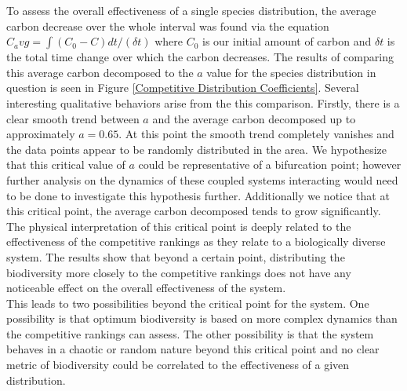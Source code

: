 \documentclass[12pt]{article}
\begin{document}
\begin{multicols}{2}
To assess the overall effectiveness of a single species distribution, the average carbon decrease over the whole interval was found via the equation $C_avg = \int (C_{0}-C)dt/(\delta t)$ where $C_{0}$ is our initial amount of carbon and $\delta t$ is the total time change over which the carbon decreases. The results of comparing this average carbon decomposed to the $a$ value for the species distribution in question is seen in Figure \ref{Competitive Distribution Coefficients}. Several interesting qualitative behaviors arise from the this comparison. Firstly, there is a clear smooth trend between $a$ and the average carbon decomposed up to approximately $a=0.65$. At this point the smooth trend completely vanishes and the data points appear to be randomly distributed in the area. We hypothesize that this critical value of $a$ could be representative of a bifurcation point; however further analysis on the dynamics of these coupled systems interacting would need to be done to investigate this hypothesis further. Additionally we notice that at this critical point, the average carbon decomposed tends to grow significantly. The physical interpretation of this critical point is deeply related to the effectiveness of the competitive rankings as they relate to a biologically diverse system. The results show that beyond a certain point, distributing the biodiversity more closely to the competitive rankings does not have any noticeable effect on the overall effectiveness of the system. \\
This leads to two possibilities beyond the critical point for the system. One possibility is that optimum biodiversity is based on more complex dynamics than the competitive rankings can assess. The other possibility is that the system behaves in a chaotic or random nature beyond this critical point and no clear metric of biodiversity could be correlated to the effectiveness of a given distribution.

\end{multicols}
\end{document}
